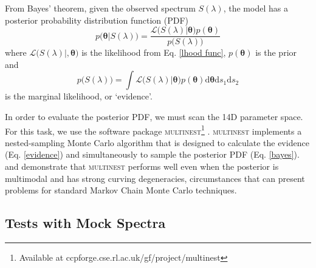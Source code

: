 \documentclass[twocolumn]{aastex6}
\begin{document}
From Bayes' theorem, given the observed spectrum $S(\lambda)$, the model has a posterior probability distribution function (PDF)
\begin{equation}
\label{bayes}
p\Big(\bm{\theta}|S(\lambda)\Big)=\frac{\mathcal{L}\Big(S(\lambda)|\bm{\theta}\Big)p(\bm{\theta})}{p\Big(S(\lambda)\Big)}
\end{equation}
where $\mathcal{L}\Big(S(\lambda)|,\bm{\theta}\Big)$ is the likelihood from Eq. \ref{lhood func}, $p(\bm{\theta})$ is the prior and
\begin{equation}
\label{evidence}
p\Big(S(\lambda)\Big)=\int\mathcal{L}\Big(S(\lambda)|\bm{\theta}\Big)p(\bm{\theta})\mathrm{d}\bm{\theta}\mathrm{d}s_1\mathrm{d}s_2
\end{equation}
is the marginal likelihood, or `evidence'.

In order to evaluate the posterior PDF, we must scan the 14D parameter space.
For this task, we use the software package \textsc{multinest}\footnote{Available at ccpforge.cse.rl.ac.uk/gf/project/multinest} \citep{Feroz2008, Feroz2009}.
\textsc{multinest} implements a nested-sampling Monte Carlo algorithm that is designed to calculate the evidence (Eq. \ref{evidence}) and simultaneously to sample the posterior PDF (Eq. \ref{bayes}).
\citet{Feroz2008} and \citet{Feroz2009} demonstrate that \textsc{multinest} performs well even when the posterior is multimodal and has strong curving degeneracies, circumstances that can present problems for standard Markov Chain Monte Carlo techniques.

\subsection{Tests with Mock Spectra}
\label{mock spectra}
\end{document}

